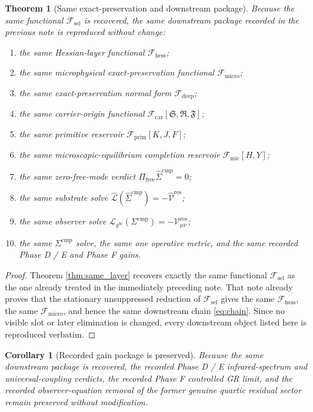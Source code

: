 \documentclass[11pt]{article}
\newcommand{\ObserverMetric}{g^{\mathrm{br}}}
\newcommand{\CompShift}{\Sigma^{\mathrm{cmp}}}
\newcommand{\CompLift}{\widehat\Sigma^{\mathrm{cmp}}}
\newcommand{\ResidualCore}{\mathcal V_{\mu\nu}^{\mathrm{res}}}
\newcommand{\ResidualLift}{\widehat{\mathcal V}^{\mathrm{res}}}
\newcommand{\SubReducedEin}{\widehat{\mathcal L}}
\newcommand{\FreeProj}{\Pi_{\mathrm{free}}}
\newcommand{\GaugeAux}{Y}
\newcommand{\ReducedEin}{\mathcal L_{\ObserverMetric}}
\newcommand{\MicFunctional}{\mathscr F_{\mathrm{mic}}}
\newcommand{\PrimFunctional}{\mathscr F_{\mathrm{prim}}}
\newcommand{\CarrierFunctional}{\mathscr F_{\mathrm{car}}}
\newcommand{\DeepFunctional}{\mathscr F_{\mathrm{deep}}}
\newcommand{\UltraFunctional}{\mathscr F_{\mathrm{micro}}}
\newcommand{\RootFunctional}{\mathscr F_{\mathrm{hess}}}
\newcommand{\StemFunctional}{\mathscr F_{\mathrm{sel}}}
\newcommand{\PrimStrain}{K}
\newcommand{\PrimNeutral}{J}
\newcommand{\PrimFree}{F}
\newcommand{\CarrierSeed}{\mathfrak S}
\newcommand{\RelabelSeed}{\mathfrak R}
\newcommand{\FreeSeed}{\mathfrak F}
\newtheorem{corollary}{Corollary}
\newtheorem{theorem}{Theorem}
\begin{document}
\begin{theorem}[Same exact-preservation and downstream package]
\label{thm:same_package}
Because the same functional \(\StemFunctional\) is recovered, the same downstream package recorded in the previous note is reproduced without change:
\begin{enumerate}
    \item the same Hessian-layer functional \(\RootFunctional\);
    \item the same microphysical exact-preservation functional \(\UltraFunctional\);
    \item the same exact-preservation normal form \(\DeepFunctional\);
    \item the same carrier-origin functional \(\CarrierFunctional[\CarrierSeed,\RelabelSeed,\FreeSeed]\);
    \item the same primitive reservoir \(\PrimFunctional[\PrimStrain,\PrimNeutral,\PrimFree]\);
    \item the same microscopic-equilibrium completion reservoir \(\MicFunctional[H,\GaugeAux]\);
    \item the same zero-free-mode verdict \(\FreeProj\CompLift=0\);
    \item the same substrate solve \(\SubReducedEin(\CompLift)=-\ResidualLift\);
    \item the same observer solve \(\ReducedEin(\CompShift)=-\ResidualCore\);
    \item the same \(\Sigma^{\mathrm{cmp}}\) solve, the same one operative metric, and the same recorded Phase D / E and Phase F gains.
\end{enumerate}
\end{theorem}

\begin{proof}
Theorem \ref{thm:same_layer} recovers exactly the same functional \(\StemFunctional\) as the one already treated in the immediately preceding note. That note already proves that the stationary unsuppressed reduction of \(\StemFunctional\) gives the same \(\RootFunctional\), the same \(\UltraFunctional\), and hence the same downstream chain \eqref{eq:chain}. Since no visible slot or later elimination is changed, every downstream object listed here is reproduced verbatim.
\end{proof}

\begin{corollary}[Recorded gain package is preserved]
\label{cor:gains}
Because the same downstream package is recovered, the recorded Phase D / E infrared-spectrum and universal-coupling verdicts, the recorded Phase F controlled GR limit, and the recorded observer-equation removal of the former genuine quartic residual sector remain preserved without modification.
\end{corollary}
\end{document}
